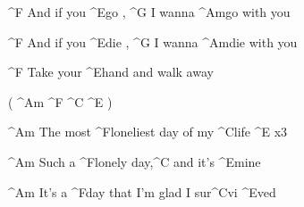 \begin{song}
\begin{verse}
\end{verse}


\begin{bridge}

	^{F} And if you ^{E}go , ^{G} I wanna ^{Am}go  with you 
	
	^{F} And if you ^{E}die , ^{G} I wanna ^{Am}die  with you 
	
	^{F} Take your ^{E}hand  and walk away 
	

	 ( ^{Am}  ^{F}  ^{C}  ^{E}  )                       
	
	
	^{Am} The most ^{F}loneliest  day of my ^{C}life   ^{E}        x3
	
	
	^{Am} Such a ^{F}lonely  day,^{C}  and it's ^{E}mine  
	
	^{Am} It's a ^{F}day  that I'm glad I sur^{C}vi ^{E}ved  
\end{bridge}
	


		
\end{song}